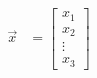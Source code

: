 \begin{align}
    \vec{x} &= \begin{bmatrix}
           x_{1} \\
           x_{2} \\
           \vdots \\
           x_{3}
         \end{bmatrix}
\end{align}
